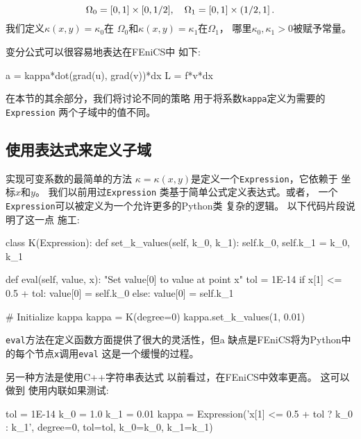 \begin{equation*}
\Omega_0 = [0, 1]\times [0,1/2],\quad
\Omega_1 = [0, 1]\times (1/2,1]\tp
\end{equation*}
我们定义$\kappa(x,y)=\kappa_0$在
$\Omega_0$和$\kappa(x,y)=\kappa_1$在$\Omega_1$，
哪里$\kappa_0, \kappa_1 > 0$被赋予常量。


变分公式可以很容易地表达在FEniCS中
如下:
\begin{python}
a = kappa*dot(grad(u), grad(v))*dx
L = f*v*dx
\end{python}
在本节的其余部分，我们将讨论不同的策略
用于将系数\texttt{kappa}定义为需要的\texttt{Expression}
两个子域中的值不同。

\subsection{使用表达式来定义子域}

实现可变系数的最简单的方法
$\kappa = \kappa(x,y)$是定义一个\texttt{Expression}，它依赖于
坐标$x$和$y$。 我们以前用过\texttt{Expression}
类基于简单公式定义表达式。或者，
一个\texttt{Expression}可以被定义为一个允许更多的Python类
复杂的逻辑。 以下代码片段说明了这一点
施工:

\begin{python}
class K(Expression):
    def set_k_values(self, k_0, k_1):
        self.k_0, self.k_1 = k_0, k_1

    def eval(self, value, x):
        "Set value[0] to value at point x"
        tol = 1E-14
        if x[1] <= 0.5 + tol:
            value[0] = self.k_0
        else:
            value[0] = self.k_1

# Initialize kappa
kappa = K(degree=0)
kappa.set_k_values(1, 0.01)
\end{python}
\texttt{eval}方法在定义函数方面提供了很大的灵活性，但a
缺点是FEniCS将为Python中的每个节点\texttt{x}调用\texttt{eval}
这是一个缓慢的过程。

另一种方法是使用C++字符串表达式
以前看过，在FEniCS中效率更高。 这可以做到
使用内联如果测试:

\begin{python}
tol = 1E-14
k_0 = 1.0
k_1 = 0.01
kappa = Expression('x[1] <= 0.5 + tol ? k_0 : k_1', degree=0,
               tol=tol, k_0=k_0, k_1=k_1)
\end{python}

